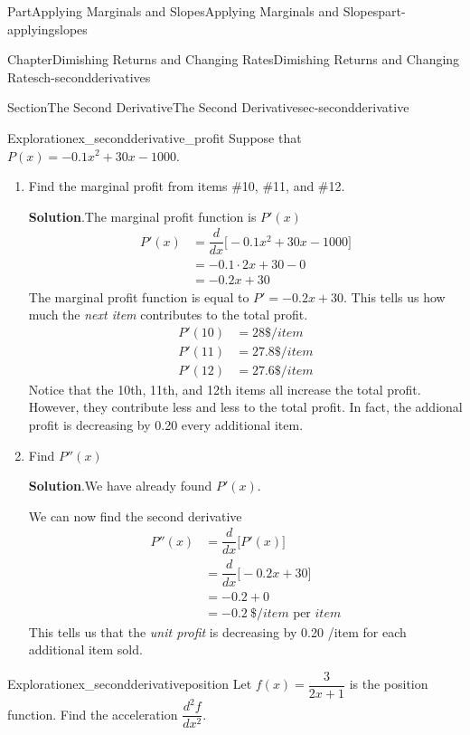 \documentclass{tufte-book}
\newcommand{\blocktitlefont}{\relax}
\numberwithin{equation}{chapter}
\newcommand{\ddx}[1]{ \dfrac{d}{dx} \Big[ #1 \Big]  }
\newcommand{\amp}{&}
\begin{document}
\begin{partptx}{Part}{Applying Marginals and Slopes}{}{Applying Marginals and Slopes}{}{}{part-applyingslopes}
\begin{chapterptx}{Chapter}{Dimishing Returns and Changing Rates}{}{Dimishing Returns and Changing Rates}{}{}{ch-secondderivatives}
\begin{sectionptx}{Section}{The Second Derivative}{}{The Second Derivative}{}{}{sec-secondderivative}
%
\begin{exploration}{Exploration}{}{ex_secondderivative_profit}%
Suppose that \(P(x) = -0.1x^2  + 30x - 1000 \).%
\begin{enumerate}[font=\bfseries,label=(\alph*),ref=\alph*]%
\item{}Find the marginal profit from items \#10, \#11, and \#12.%
\par\smallskip%
\noindent\textbf{\blocktitlefont Solution}.\hypertarget{ex_secondderivative_profit-2-2}{}\quad{}The marginal profit function is \(P'(x)\)%
\begin{align*}
P'(x) \amp = \ddx{-0.1x^2  + 30x - 1000 }\\
\amp =-0.1\cdot 2x + 30 - 0 \\
\amp = -0.2 x + 30
\end{align*}
The marginal profit function is equal to \(P' = -0.2 x + 30 \). This tells us how much the \emph{next item} contributes to the total profit.%
\begin{align*}
P'(10) \amp = 28 \$/item \\
P'(11) \amp = 27.8 \$/item \\
P'(12) \amp = 27.6 \$/item 
\end{align*}
Notice that the 10th, 11th, and 12th items all increase the total profit. However, they contribute less and less to the total profit. In fact, the addional profit is decreasing by \textdollar{}0.20 every additional item.%
\item{}Find \(P''(x)\)%
\par\smallskip%
\noindent\textbf{\blocktitlefont Solution}.\hypertarget{ex_secondderivative_profit-3-2}{}\quad{}We have already found \(P'(x)\).%
\par
We can now find the second derivative%
\begin{align*}
P''(x) \amp = \ddx{ P'(x) } \\
\amp = \ddx{ -0.2 x + 30 } \\
\amp = -0.2 + 0 \\
\amp = -0.2 \ \$/item\text{ per } item 
\end{align*}
This tells us that the \emph{unit profit} is decreasing by \textdollar{}0.20 \textdollar{}\slash{}item for each additional item sold.%
\end{enumerate}%
\end{exploration}%
\begin{exploration}{Exploration}{}{ex_secondderivativeposition}%
Let \(f(x) = \dfrac{3}{2x+1}\) is the position function. Find the acceleration \(\dfrac{d^2f}{dx^2}\).%

\end{exploration}
\end{sectionptx}
\end{chapterptx}
\end{partptx}
\end{document}
